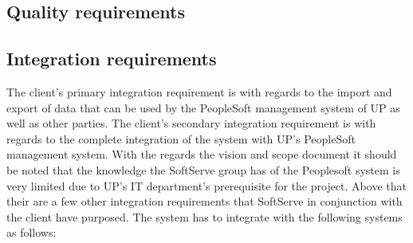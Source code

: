\documentclass[12pt]{article}
\begin{document}
\subsection{Quality requirements}
\vspace{0.2in}



\vspace{0.1in}
\newpage
\subsection{Integration requirements}
\vspace{0.2in}
The client's primary integration requirement is with regards to the import and export of data that can be used by the PeopleSoft management system of UP as well as other parties. The client's secondary integration requirement is with regards to the complete integration of the system with UP's PeopleSoft management system. With the regards the vision and scope document it should be noted that the knowledge the SoftServe group has of the Peoplesoft system is very limited due to UP's IT department's prerequisite for the project. Above that their are a few other integration requirements that SoftServe in conjunction with the client have purposed. The system has to integrate with the following systems as follows:
\end{document}

